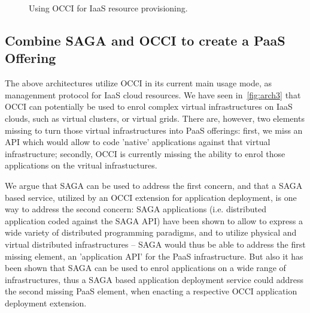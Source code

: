 \documentclass[10pt,conference,final,letterpaper,twoside,twocolumn,]{IEEEtran}
\newcommand{\T}[1]{\texttt{#1}}
\begin{document}
\begin{figure}[htb]
 \caption{\label{fig:arch2} Using OCCI for IaaS resource provisioning.}
\end{figure}





 \subsection{Combine SAGA and OCCI to create a PaaS Offering}

 The above architectures utilize OCCI in its current main usage mode,
 as managenment protocol for IaaS cloud resources.  We have seen
 in~\ref{fig:arch3} that OCCI can potentially be used to enrol complex
 virtual infrastructures on IaaS clouds, such as virtual clusters, or
 virtual grids.  There are, however, two elements missing to turn
 those virtual infrastructures into PaaS offerings: first, we miss an
 API which would allow to code 'native' applications against that
 virtual infrastructure; secondly, OCCI is currently missing the
 ability to enrol those applications on the vritual infrastuctures.

 We argue that SAGA can be used to address the first concern, and that
 a SAGA based service, utilized by an OCCI extension for application
 deployment, is one way to address the second concern:  SAGA
 applications (i.e. distributed application coded against the SAGA
 API) have been shown to allow to express a wide variety of
 distributed programming paradigms, and to utilize physical and
 virtual distributed infrastructures -- SAGA would thus be able to
 address the first missing element, an 'application API' for the PaaS
 infrastructure.  But also it has been shown that SAGA can be used to
 enrol applications on a wide range of infrastructures, thus a SAGA
 based application deployment service could address the second missing
 PaaS element, when enacting a respective OCCI application deployment
 extension.
\end{document}
